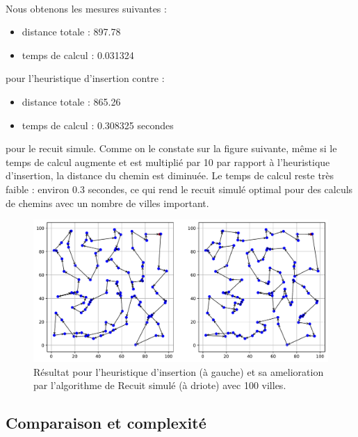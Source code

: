 \documentclass[a4paper,11pt,fleqn]{article}
\begin{document}
\paragraph{}
Nous obtenons les mesures suivantes : 
\begin{itemize}
    \item distance totale : 897.78
    \item temps de calcul : 0.031324
\end{itemize} 
pour l'heuristique d'insertion contre :
\begin{itemize}
    \item distance totale : 865.26
    \item temps de calcul : 0.308325 secondes
\end{itemize}
pour le recuit simule.
Comme on le constate sur la figure suivante, même si le temps de calcul augmente et est multiplié par 10 par rapport à l'heuristique d'insertion, la distance du chemin est diminuée. 
Le temps de calcul reste très faible : environ 0.3 secondes, ce qui rend le recuit simulé optimal pour des calculs de chemins avec un nombre de villes important.
\begin{figure}[H]
    \centering
    \includegraphics[width=\textwidth]{images/recuit_simule.pdf}
    \caption{Résultat pour l'heuristique d'insertion (à gauche) et sa amelioration par l'algorithme de Recuit simulé (à driote) avec 100 villes.}
    \label{fig:recuit}
\end{figure}

\subsection*{Comparaison et complexité}
\end{document}
